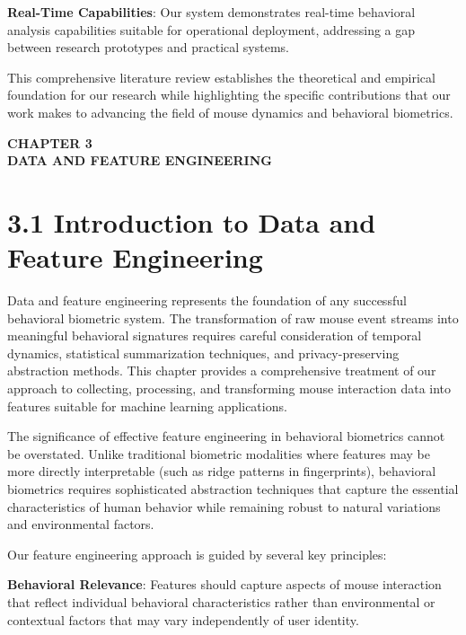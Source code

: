 \documentclass[
  12pt,
  a4paper,
]{report}
\begin{document}
\textbf{Real-Time Capabilities}: Our system demonstrates real-time
behavioral analysis capabilities suitable for operational deployment,
addressing a gap between research prototypes and practical systems.

This comprehensive literature review establishes the theoretical and
empirical foundation for our research while highlighting the specific
contributions that our work makes to advancing the field of mouse
dynamics and behavioral biometrics.

\newpage

\newpage
\thispagestyle{plain}

\begin{center}
\vspace\*{2cm}
\textbf{\Large CHAPTER 3}\\[0.5cm]
\textbf{\Large DATA AND FEATURE ENGINEERING}
\end{center}

\newpage

\section{3.1 Introduction to Data and Feature
Engineering}\label{introduction-to-data-and-feature-engineering}

Data and feature engineering represents the foundation of any successful
behavioral biometric system. The transformation of raw mouse event
streams into meaningful behavioral signatures requires careful
consideration of temporal dynamics, statistical summarization
techniques, and privacy-preserving abstraction methods. This chapter
provides a comprehensive treatment of our approach to collecting,
processing, and transforming mouse interaction data into features
suitable for machine learning applications.

The significance of effective feature engineering in behavioral
biometrics cannot be overstated. Unlike traditional biometric modalities
where features may be more directly interpretable (such as ridge
patterns in fingerprints), behavioral biometrics requires sophisticated
abstraction techniques that capture the essential characteristics of
human behavior while remaining robust to natural variations and
environmental factors.

Our feature engineering approach is guided by several key principles:

\textbf{Behavioral Relevance}: Features should capture aspects of mouse
interaction that reflect individual behavioral characteristics rather
than environmental or contextual factors that may vary independently of
user identity.
\end{document}
